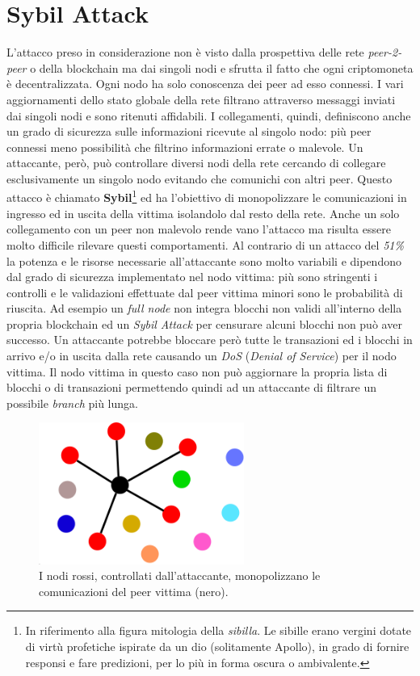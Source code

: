 \section{Sybil Attack}
L'attacco preso in considerazione non è visto dalla prospettiva delle rete \textit{peer-2-peer} o della blockchain ma dai singoli nodi e sfrutta il fatto che ogni criptomoneta è decentralizzata. Ogni nodo ha solo conoscenza dei peer ad esso connessi. I vari aggiornamenti dello stato globale della rete filtrano attraverso messaggi inviati dai singoli nodi e sono ritenuti affidabili.\newline
I collegamenti, quindi, definiscono anche un grado di sicurezza sulle informazioni ricevute al singolo nodo: più peer connessi meno possibilità che filtrino informazioni errate o malevole. Un attaccante, però, può controllare diversi nodi della rete cercando di collegare esclusivamente un singolo nodo evitando che comunichi con altri peer. Questo attacco è chiamato \textbf{Sybil}\footnote{In riferimento alla figura mitologia della \textit{sibilla}. Le sibille erano vergini dotate di virtù profetiche ispirate da un dio (solitamente Apollo), in grado di fornire responsi e fare predizioni, per lo più in forma oscura o ambivalente.} ed ha l'obiettivo di monopolizzare le comunicazioni in ingresso ed in uscita della vittima isolandolo dal resto della rete. Anche un solo collegamento con un peer non malevolo rende vano l'attacco ma risulta essere molto difficile rilevare questi comportamenti.\newline
Al contrario di un attacco del \textit{51\%} la potenza e le risorse necessarie all'attaccante sono molto variabili e dipendono dal grado di sicurezza implementato nel nodo vittima: più sono stringenti i controlli e le validazioni effettuate dal peer vittima minori sono le probabilità di riuscita. Ad esempio un \textit{full node} non integra blocchi non validi all'interno della propria blockchain ed un \textit{Sybil Attack} per censurare alcuni blocchi non può aver successo. Un attaccante potrebbe bloccare però tutte le transazioni ed i blocchi in arrivo e/o in uscita dalla rete causando un \textit{DoS} (\textit{Denial of Service}) per il nodo vittima. Il nodo vittima in questo caso non può aggiornare la propria lista di blocchi o di transazioni permettendo quindi ad un attaccante di filtrare un possibile \textit{branch} più lunga.\newline
\begin{figure}
    \centering
    \includegraphics[width=0.6\textwidth]{images/sybil.png}
    \caption{I nodi rossi, controllati dall'attaccante, monopolizzano le comunicazioni del peer vittima (nero). \cite{owning}}
\end{figure}
